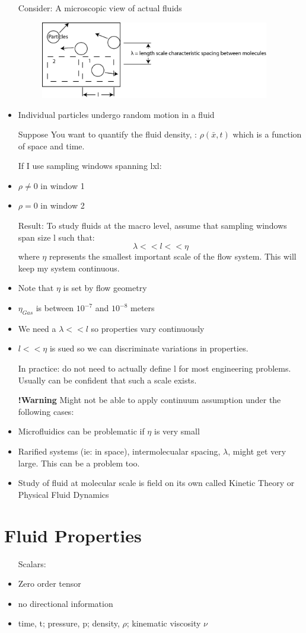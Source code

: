 \documentclass[12pt]{report}
\begin{document}
\begin{itemize}
\item[Consider:] A microscopic view of actual fluids
\begin{figure}[h]
\centering
\includegraphics[width=100mm]{MicroscopicFluidExampleME351A.jpg}
\end{figure}
\item Individual particles undergo random motion in a fluid
\item[Suppose] You want to quantify the fluid density, \textrho : $\rho(\bar{x},t) $ which is a function of space and time.

If I use sampling windows spanning lxl:
\item $\rho \neq 0 $ in window 1
\item $\rho = 0$ in window 2
\item[Result: ] To study fluids at the macro level, assume that sampling windows span size l such that:
\[\lambda<<l<<\eta\]
where $\eta$ represents the smallest important scale of the flow system. This will keep my system continuous.
\item Note that $\eta$ is set by flow geometry
\item $\eta_{Gas}$ is between $10^{-7}$ and $10^{-8}$ meters

\item We need a $\lambda<<l$ so properties vary continuously
\item $l<<\eta$ is sued so we can discriminate variations in properties.

\item[In practice: ] do not need to actually define l for most engineering problems. Usually can be confident that such a scale exists. 

\item[\textbf{!Warning}] Might not be able to apply continuum assumption under the following cases:
\item Microfluidics can be problematic if $\eta$ is very small
\item Rarified systems (ie: in space), intermolecualar spacing, $\lambda$, might get very large. This can be a problem too.
\item Study of fluid at molecular scale is field on its own called Kinetic Theory or Physical Fluid Dynamics

\end{itemize}
\section{Fluid Properties}
\begin{itemize}
\item[Scalars:]
\item Zero order tensor
\item no directional information
\item time, t; pressure, p; density, $\rho$; kinematic viscosity $\nu$
\end{itemize}
\end{document}

